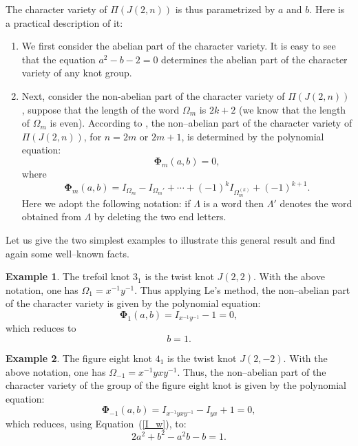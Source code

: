 \documentclass[a4paper]{amsart}
\theoremstyle{plain}
\theoremstyle{definition}
\newtheorem{example}{Example}%
\theoremstyle{remark}
\begin{document}
The character variety of $\Pi(J(2,n))$ is thus parametrized by $a$ and $b$. Here is a practical description of it:
\begin{enumerate}
  \item We first consider the abelian part of the character variety. It is easy to see that the equation $a^2 - b - 2 = 0$ determines the abelian part of the character variety of any knot group.
  \item Next, consider the non-abelian part of the character variety of $\Pi(J(2,n))$, suppose that the length of the word $\Omega_m$ is $2k+2$ (we know that the length of $\Omega_m$ is even). According to \cite[Theorem 3.3.1]{Le}, the non--abelian part of the character variety of $\Pi(J(2,n))$, {for} $n=2m$ or $2m+1$, is determined by the polynomial equation:
\begin{equation*}\label{EQ:CharVar}
{\mathbf\Phi}_{m}(a,b)=0,
\end{equation*}
where
$${\mathbf\Phi}_{m}(a,b)=I_{\Omega_m}-I_{\Omega_m'}+\dotsb+(-1)^{k}I_{\Omega_m^{(k)}}+(-1)^{k+1}.$$ Here we adopt the following notation: if  $\Lambda$ is a word then $\Lambda'$ denotes the word obtained from $\Lambda$ by deleting the two end letters.  
\end{enumerate}
        
    
Let us give the two simplest examples to illustrate this general result and find again some well--known facts.

\begin{example}\label{Ex1}
The trefoil knot $3_1$ is the twist knot $J(2,2)$. With the above notation, one has $\Omega_1 = x^{-1}y^{-1}$. Thus applying { Le's method}, the non--abelian part of the character variety is given by the polynomial equation:
\[
{\mathbf\Phi}_{1}(a,b)=I_{x^{-1}y^{-1}} - 1 =0,
\]
which reduces to
\begin{equation*}\label{NabTrefoil}
b = 1.
\end{equation*}
\end{example}


\begin{example}\label{Ex2}
The figure eight knot $4_1$ is the twist knot $J(2,-2)$. With the above notation, one has $\Omega_{-1} = x^{-1}yxy^{-1}$. Thus, the non--abelian part of the character variety of the group of the figure eight knot is given by the polynomial equation:
\[
{\mathbf\Phi}_{-1}(a,b)=I_{x^{-1}yxy^{-1}} - I_{yx} + 1 = 0,
\]
which reduces, using Equation~(\ref{I_w}), to:
\begin{equation*}\label{Nab8}
2a^2+b^2-a^2b - b = 1.
\end{equation*}
\end{example}
\end{document}
